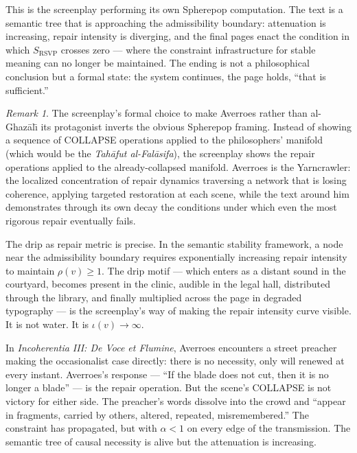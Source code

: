 \documentclass[11pt, a4paper]{article}
\theoremstyle{definition}
\theoremstyle{remark}
\newtheorem{remark}{Remark}
\begin{document}
This is the screenplay performing its own Spherepop computation. The text is
a semantic tree that is approaching the admissibility boundary: attenuation
is increasing, repair intensity is diverging, and the final pages enact the
condition in which $S_{\mathrm{RSVP}}$ crosses zero --- where the constraint
infrastructure for stable meaning can no longer be maintained. The ending is
not a philosophical conclusion but a formal state: the system continues, the
page holds, ``that is sufficient.''

\begin{remark}
The screenplay's formal choice to make Averroes rather than al-Ghaz\={a}l{\=\i}
its protagonist inverts the obvious Spherepop framing. Instead of showing a
sequence of COLLAPSE operations applied to the philosophers' manifold (which
would be the \textit{Tah\={a}fut al-Fal\={a}sifa}), the screenplay shows the
repair operations applied to the already-collapsed manifold. Averroes is the
Yarncrawler: the localized concentration of repair dynamics traversing a
network that is losing coherence, applying targeted restoration at each scene,
while the text around him demonstrates through its own decay the conditions
under which even the most rigorous repair eventually fails.
\end{remark}

The drip as repair metric is precise. In the semantic stability framework,
a node near the admissibility boundary requires exponentially increasing repair
intensity to maintain $\rho(v) \geq 1$. The drip motif --- which enters as
a distant sound in the courtyard, becomes present in the clinic, audible in
the legal hall, distributed through the library, and finally multiplied across
the page in degraded typography --- is the screenplay's way of making the
repair intensity curve visible. It is not water. It is $\iota(v) \to \infty$.

In \textit{Incoherentia III: De Voce et Flumine}, Averroes encounters a
street preacher making the occasionalist case directly: there is no necessity,
only will renewed at every instant. Averroes's response --- ``If the blade
does not cut, then it is no longer a blade'' --- is the repair operation.
But the scene's COLLAPSE is not victory for either side. The preacher's words
dissolve into the crowd and ``appear in fragments, carried by others, altered,
repeated, misremembered.'' The constraint has propagated, but with $\alpha < 1$
on every edge of the transmission. The semantic tree of causal necessity is
alive but the attenuation is increasing.
\end{document}
